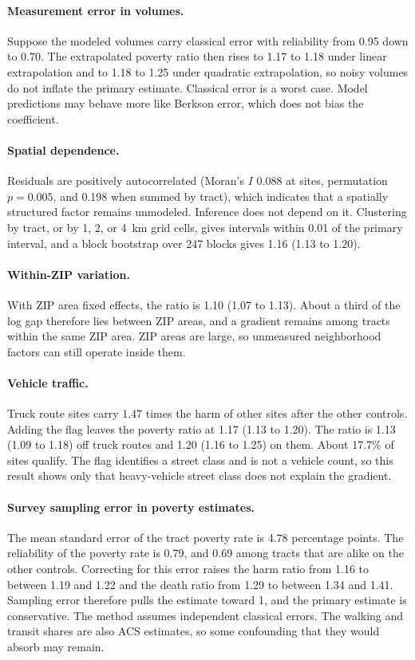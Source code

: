 \documentclass[10pt,twocolumn]{article}
\begin{document}
\paragraph{Measurement error in volumes.} Suppose the modeled volumes carry classical error with reliability from 0.95 down to 0.70. The extrapolated poverty ratio then rises to 1.17 to 1.18 under linear extrapolation and to 1.18 to 1.25 under quadratic extrapolation, so noisy volumes do not inflate the primary estimate. Classical error is a worst case. Model predictions may behave more like Berkson error, which does not bias the coefficient.

\paragraph{Spatial dependence.} Residuals are positively autocorrelated (Moran's $I$ 0.088 at sites, permutation $p=0.005$, and 0.198 when summed by tract), which indicates that a spatially structured factor remains unmodeled. Inference does not depend on it. Clustering by tract, or by 1, 2, or 4~km grid cells, gives intervals within 0.01 of the primary interval, and a block bootstrap over 247 blocks gives 1.16 (1.13 to 1.20).

\paragraph{Within-ZIP variation.} With ZIP area fixed effects, the ratio is 1.10 (1.07 to 1.13). About a third of the log gap therefore lies between ZIP areas, and a gradient remains among tracts within the same ZIP area. ZIP areas are large, so unmeasured neighborhood factors can still operate inside them.

\paragraph{Vehicle traffic.} Truck route sites carry 1.47 times the harm of other sites after the other controls. Adding the flag leaves the poverty ratio at 1.17 (1.13 to 1.20). The ratio is 1.13 (1.09 to 1.18) off truck routes and 1.20 (1.16 to 1.25) on them. About 17.7\% of sites qualify. The flag identifies a street class and is not a vehicle count, so this result shows only that heavy-vehicle street class does not explain the gradient.

\paragraph{Survey sampling error in poverty estimates.} The mean standard error of the tract poverty rate is 4.78 percentage points. The reliability of the poverty rate is 0.79, and 0.69 among tracts that are alike on the other controls. Correcting for this error raises the harm ratio from 1.16 to between 1.19 and 1.22 and the death ratio from 1.29 to between 1.34 and 1.41. Sampling error therefore pulls the estimate toward 1, and the primary estimate is conservative. The method assumes independent classical errors. The walking and transit shares are also ACS estimates, so some confounding that they would absorb may remain.
\end{document}
